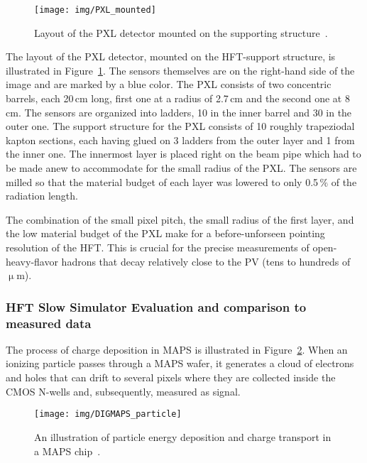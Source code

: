 \begin{figure}[!htb]
\begin{center}
 \texttt{[image: img/PXL\_mounted]}\\
\end{center}
\caption{\label{PXL}Layout of the PXL detector mounted on the supporting structure~\cite{HftTdr}.}
\end{figure}

The layout of the PXL detector, mounted on the HFT-support structure, is illustrated in Figure~\ref{PXL}\@. The sensors themselves are on the right-hand side of the image and are marked by a blue color. The PXL consists of two concentric barrels, each 20$\,$cm long, first one at a radius of 2.7$\,$cm and the second one at 8$\,$cm.  The sensors are organized into ladders, 10 in the inner barrel and 30 in the outer one. The support structure for the PXL consists of 10 roughly trapeziodal kapton sections, each having glued on 3 ladders from the outer layer and 1 from the inner one. The innermost layer is placed right on the beam pipe which had to be made anew to accommodate for the small radius of the PXL\@. The sensors are milled so that the material budget of each layer was lowered to only 0.5$\,\%$ of the radiation length.

The combination of the small pixel pitch, the small radius of the first layer, and the low material budget of the PXL make for a before-unforseen pointing resolution of the HFT\@. This is crucial for the precise measurements of open-heavy-flavor hadrons that decay relatively close to the PV (tens to hundreds of $\upmu$m)\@.  

\subsubsection{HFT Slow Simulator Evaluation and comparison to measured data}
The process of charge deposition in MAPS is illustrated in Figure~\ref{DigmapsIllustration}\@.
When an ionizing particle passes through a MAPS wafer, it generates a cloud of electrons and holes that can drift to several pixels where they are collected inside the CMOS N-wells and, subsequently, measured as signal.  

\begin{figure}[!htb]
\begin{center}
 \texttt{[image: img/DIGMAPS\_particle]}\\
\end{center}
\caption{\label{DigmapsIllustration}An illustration of particle energy deposition and charge transport in a MAPS chip~\cite{DIGMAPS}.}
\end{figure}

